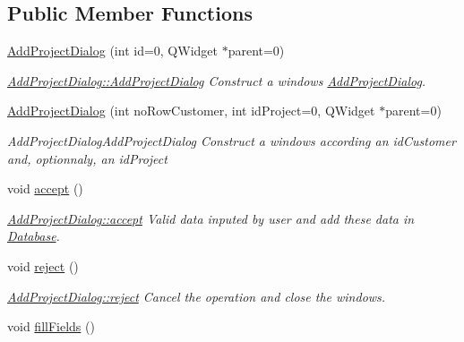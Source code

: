 \subsection*{Public Member Functions}
\begin{DoxyCompactItemize}
\item 
\hyperlink{classGui_1_1Dialogs_1_1AddProjectDialog_a1fa86f5366f321233655aaf6923ec892}{Add\+Project\+Dialog} (int id=0, Q\+Widget $\ast$parent=0)
\begin{DoxyCompactList}\small\item\em \hyperlink{classGui_1_1Dialogs_1_1AddProjectDialog_a1fa86f5366f321233655aaf6923ec892}{Add\+Project\+Dialog\+::\+Add\+Project\+Dialog} Construct a windows \hyperlink{classGui_1_1Dialogs_1_1AddProjectDialog}{Add\+Project\+Dialog}. \end{DoxyCompactList}\item 
\hyperlink{classGui_1_1Dialogs_1_1AddProjectDialog_a7433c07961921a18abb56a6aeb741b1f}{Add\+Project\+Dialog} (int no\+Row\+Customer, int id\+Project=0, Q\+Widget $\ast$parent=0)
\begin{DoxyCompactList}\small\item\em Add\+Project\+Dialog\+Add\+Project\+Dialog Construct a windows according an {\itshape id\+Customer} and, optionnaly, an {\itshape id\+Project} \end{DoxyCompactList}\item 
\hypertarget{classGui_1_1Dialogs_1_1AddProjectDialog_abe345ededea4911846a44b984cc04f18}{void \hyperlink{classGui_1_1Dialogs_1_1AddProjectDialog_abe345ededea4911846a44b984cc04f18}{accept} ()}\label{classGui_1_1Dialogs_1_1AddProjectDialog_abe345ededea4911846a44b984cc04f18}

\begin{DoxyCompactList}\small\item\em \hyperlink{classGui_1_1Dialogs_1_1AddProjectDialog_abe345ededea4911846a44b984cc04f18}{Add\+Project\+Dialog\+::accept} Valid data inputed by user and add these data in \hyperlink{namespaceDatabase}{Database}. \end{DoxyCompactList}\item 
\hypertarget{classGui_1_1Dialogs_1_1AddProjectDialog_a767dcea1ae96d2efc3085f8ade4406ce}{void \hyperlink{classGui_1_1Dialogs_1_1AddProjectDialog_a767dcea1ae96d2efc3085f8ade4406ce}{reject} ()}\label{classGui_1_1Dialogs_1_1AddProjectDialog_a767dcea1ae96d2efc3085f8ade4406ce}

\begin{DoxyCompactList}\small\item\em \hyperlink{classGui_1_1Dialogs_1_1AddProjectDialog_a767dcea1ae96d2efc3085f8ade4406ce}{Add\+Project\+Dialog\+::reject} Cancel the operation and close the windows. \end{DoxyCompactList}\item 
\hypertarget{classGui_1_1Dialogs_1_1AddProjectDialog_af31b6ed23acdd5fb8b71caaeddce34f4}{void \hyperlink{classGui_1_1Dialogs_1_1AddProjectDialog_af31b6ed23acdd5fb8b71caaeddce34f4}{fill\+Fields} ()}\label{classGui_1_1Dialogs_1_1AddProjectDialog_af31b6ed23acdd5fb8b71caaeddce34f4}


\end{DoxyCompactItemize}
